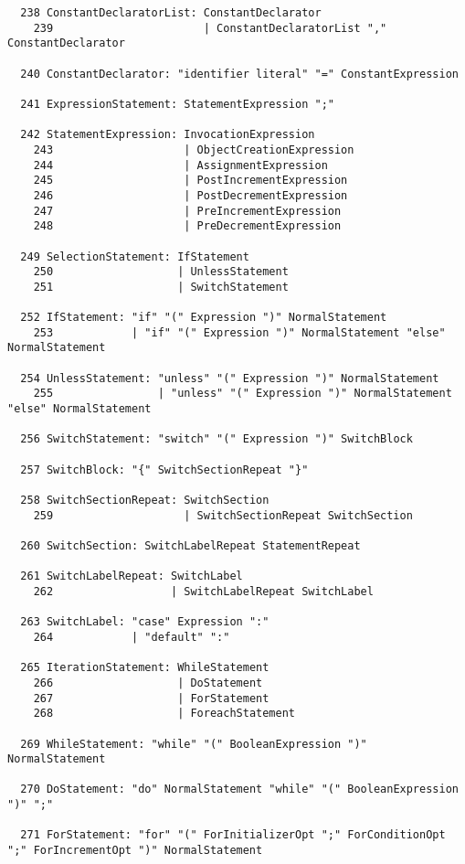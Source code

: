 \begin{espacosimples}
\begin{scriptsize}
\begin{lstlisting}
  238 ConstantDeclaratorList: ConstantDeclarator
    239                       | ConstantDeclaratorList "," ConstantDeclarator
  
  240 ConstantDeclarator: "identifier literal" "=" ConstantExpression
  
  241 ExpressionStatement: StatementExpression ";"
  
  242 StatementExpression: InvocationExpression
    243                    | ObjectCreationExpression
    244                    | AssignmentExpression
    245                    | PostIncrementExpression
    246                    | PostDecrementExpression
    247                    | PreIncrementExpression
    248                    | PreDecrementExpression
  
  249 SelectionStatement: IfStatement
    250                   | UnlessStatement
    251                   | SwitchStatement
  
  252 IfStatement: "if" "(" Expression ")" NormalStatement
    253            | "if" "(" Expression ")" NormalStatement "else" NormalStatement
  
  254 UnlessStatement: "unless" "(" Expression ")" NormalStatement
    255                | "unless" "(" Expression ")" NormalStatement "else" NormalStatement
  
  256 SwitchStatement: "switch" "(" Expression ")" SwitchBlock
  
  257 SwitchBlock: "{" SwitchSectionRepeat "}"
  
  258 SwitchSectionRepeat: SwitchSection
    259                    | SwitchSectionRepeat SwitchSection
  
  260 SwitchSection: SwitchLabelRepeat StatementRepeat
  
  261 SwitchLabelRepeat: SwitchLabel
    262                  | SwitchLabelRepeat SwitchLabel
  
  263 SwitchLabel: "case" Expression ":"
    264            | "default" ":"
  
  265 IterationStatement: WhileStatement
    266                   | DoStatement
    267                   | ForStatement
    268                   | ForeachStatement
  
  269 WhileStatement: "while" "(" BooleanExpression ")" NormalStatement
  
  270 DoStatement: "do" NormalStatement "while" "(" BooleanExpression ")" ";"
  
  271 ForStatement: "for" "(" ForInitializerOpt ";" ForConditionOpt ";" ForIncrementOpt ")" NormalStatement
  

\end{lstlisting}
\end{scriptsize}
\end{espacosimples}
